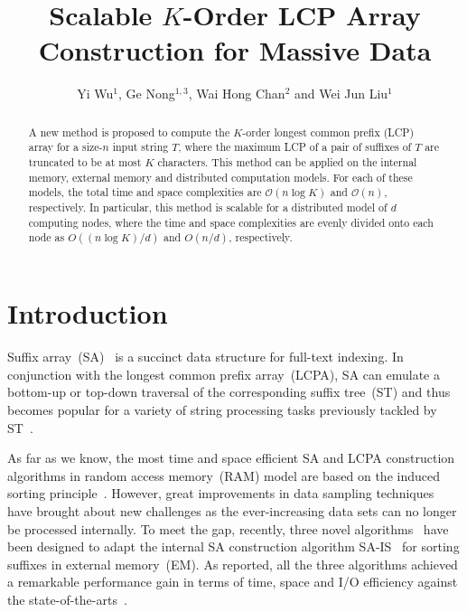 \documentclass{llncs}
\begin{document}
\title{Scalable $K$-Order {LCP} Array Construction for Massive Data}

\author{Yi Wu$^1$, Ge Nong$^{1,3}$, Wai Hong Chan$^2$ and Wei Jun Liu$^1$}


\maketitle

\begin{abstract}
A new method is proposed to compute the  $K$-order longest common prefix (LCP) array for a size-$n$ input string $T$, where the maximum LCP of a pair of suffixes of $T$ are truncated to be at most $K$ characters.
This method can be applied on the internal memory, external memory and  distributed computation models.
For each of these models, the total time and space complexities are $\mathcal{O}(n\log K)$ and $\mathcal{O}(n)$, respectively.
In particular, this method is scalable for a distributed model of $d$ computing nodes, where the time and space complexities are evenly divided onto each node as $O((n\log K)/d)$ and $O(n/d)$, respectively.
\end{abstract}

\section{Introduction}

Suffix array~({SA})~\cite{Manber1993} is a succinct data structure for full-text indexing. In conjunction with the longest common prefix array~({LCPA}), {SA} can emulate a bottom-up or top-down traversal of the corresponding suffix tree~({ST}) and thus becomes popular for a variety of string processing tasks previously tackled by {ST}~\cite{Abouelhodaa2004}.

As far as we know, the most time and space efficient SA and {LCPA} construction algorithms in random access memory~(RAM) model are based on the induced sorting principle~\cite{nong2011,Fischer11}. However, great improvements in data sampling techniques have brought about new challenges as the ever-increasing data sets can no longer be processed internally. To meet the gap, recently, three novel algorithms~\cite{Nong15, Bingmann-Code12, Nong14} have been designed to adapt the internal {SA} construction algorithm {SA-IS}~\cite{nong2011} for sorting suffixes in external memory~(EM). As reported, all the three algorithms achieved a remarkable performance gain in terms of time, space and I/O efficiency against the state-of-the-arts~\cite{Dementiev08}.
\end{document}
